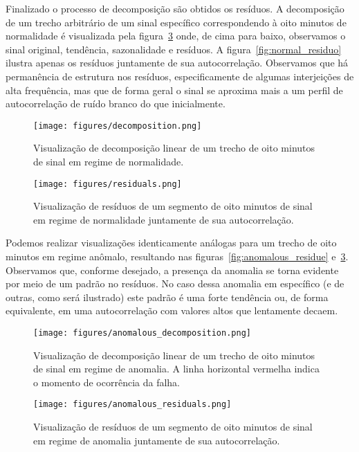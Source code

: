 Finalizado o processo de decomposição são obtidos os resíduos. A decomposição
de um trecho arbitrário de um sinal específico correspondendo à oito minutos de
normalidade é visualizada pela figura~\ref{fig:decomposition} onde, de cima
para baixo, observamos o sinal original, tendência, sazonalidade e resíduos. A
figura~\ref{fig:normal_residuo} ilustra apenas os resíduos juntamente de sua
autocorrelação. Observamos que há permanência de estrutura nos resíduos,
especificamente de algumas interjeições de alta frequência, mas que de forma
geral o sinal se aproxima mais a um perfil de autocorrelação de ruído branco
do que inicialmente.

\begin{figure}[H]
    \centering
    \texttt{[image: figures/decomposition.png]}
    \caption{Visualização de decomposição linear de um trecho de oito
    minutos de sinal em regime de normalidade.}
    \label{fig:decomposition}
\end{figure}

\begin{figure}[H]
    \centering
    \texttt{[image: figures/residuals.png]}
    \caption{Visualização de resíduos de um segmento de oito minutos de sinal
    em regime de normalidade juntamente de sua autocorrelação.}
    \label{fig:normal_residue}
\end{figure}

Podemos realizar visualizações identicamente análogas para um trecho de oito
minutos em regime anômalo, resultando nas figuras~\ref{fig:anomalous_residue}
e~\ref{fig:decomposition}. Observamos que, conforme desejado, a presença da
anomalia se torna evidente por meio de um padrão no resíduos. No caso dessa
anomalia em específico (e de outras, como será ilustrado) este padrão é uma
forte tendência ou, de forma equivalente, em uma autocorrelação com valores
altos que lentamente decaem.

\begin{figure}[H]
    \centering
    \texttt{[image: figures/anomalous\_decomposition.png]}
    \caption{Visualização de decomposição linear de um trecho de oito
    minutos de sinal em regime de anomalia. A linha horizontal vermelha
    indica o momento de ocorrência da falha.}
    \label{fig:decomposition}
\end{figure}

\begin{figure}[H]
    \centering
    \texttt{[image: figures/anomalous\_residuals.png]}
    \caption{Visualização de resíduos de um segmento de oito minutos de sinal
    em regime de anomalia juntamente de sua autocorrelação.}
    \label{fig:normal_residue}
\end{figure}

